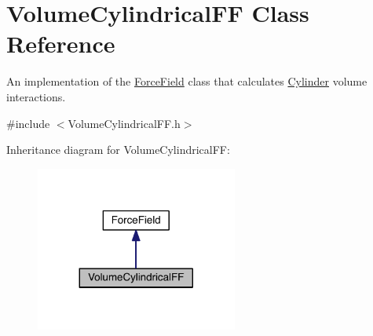 \hypertarget{classVolumeCylindricalFF}{\section{Volume\+Cylindrical\+F\+F Class Reference}
\label{classVolumeCylindricalFF}
}


An implementation of the \hyperlink{classForceField}{Force\+Field} class that calculates \hyperlink{classCylinder}{Cylinder} volume interactions.  




{\ttfamily \#include $<$Volume\+Cylindrical\+F\+F.\+h$>$}



Inheritance diagram for Volume\+Cylindrical\+F\+F\+:\nopagebreak
\begin{figure}[H]
\begin{center}
\leavevmode
\includegraphics[width=188pt]{classVolumeCylindricalFF__inherit__graph}
\end{center}
\end{figure}


